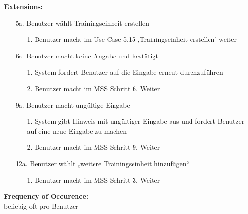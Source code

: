 \documentclass[12pt,a4paper,onecolumn]{article}
\begin{document}
\textbf{Extensions:}
\begin{enumerate}
    \item [5a.]  Benutzer wählt Trainingseinheit erstellen
    \begin{enumerate}
        \item[1.]Benutzer macht im Use Case 5.15 ‚Trainingseinheit erstellen‘ weiter
    \end{enumerate}
    \item [6a.]Benutzer macht keine Angabe und bestätigt
    \begin{enumerate}
        \item[1.]System fordert Benutzer auf die Eingabe erneut durchzuführen
        \item[2.]Benutzer macht im MSS Schritt 6. Weiter
    \end{enumerate}
    \item[9a.] Benutzer macht ungültige Eingabe
    \begin{enumerate}
        \item [1.]System gibt Hinweis mit ungültiger Eingabe aus und fordert Benutzer auf eine neue Eingabe zu machen
        \item [2.]Benutzer macht im MSS Schritt 9. Weiter
    \end{enumerate}
    \item[12a.]Benutzer wählt „weitere Trainingseinheit hinzufügen“
    \begin{enumerate}
        \item [1.]Benutzer macht im MSS Schritt 3. Weiter
    \end{enumerate}
\end{enumerate}
\textbf{Frequency of Occurence:}\\beliebig oft pro Benutzer  \\
\end{document}
